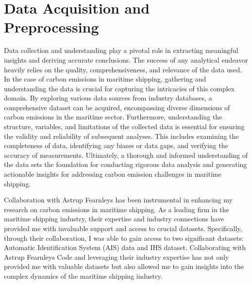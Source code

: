 \chapter{Data Acquisition and Preprocessing}

Data collection and understanding play a pivotal role in extracting meaningful insights and deriving accurate conclusions.
The success of any analytical endeavor heavily relies on the quality, comprehensiveness, and relevance of the data used.
In the case of carbon emissions in maritime shipping, gathering and understanding the data is crucial for capturing the intricacies of this complex domain.
By exploring various data sources from industry databases, a comprehensive dataset can be acquired, encompassing diverse dimensions of carbon emissions in the maritime sector.
Furthermore, understanding the structure, variables, and limitations of the collected data is essential for ensuring the validity and reliability of subsequent analyses.
This includes examining the completeness of data, identifying any biases or data gaps, and verifying the accuracy of measurements.
Ultimately, a thorough and informed understanding of the data sets the foundation for conducting rigorous data analysis and generating actionable insights for addressing carbon emission challenges in maritime shipping.

Collaboration with Astrup Fearnleys has been instrumental in enhancing my research on carbon emissions in maritime shipping.
As a leading firm in the maritime shipping industry, their expertise and industry connections have provided me with invaluable support and access to crucial datasets.
Specifically, through their collaboration, I was able to gain access to two significant datasets: Automatic Identification System (AIS) data and IHS dataset.
Collaborating with Astrup Fearnleys Code and leveraging their industry expertise has not only provided me with valuable datasets but also allowed me to gain insights into the complex dynamics of the maritime shipping industry.

\newpage



\newpage





